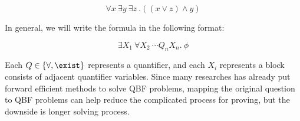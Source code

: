 \[ \forall x\ \exists y\ \exists z\ .((x\lor z)\land y) \]

In general, we will write the formula in the following format:

\[ \exists X_1\ \forall X_2\ \cdots Q_nX_n .~\phi \]

Each $Q \in \{\forall, \exist\}$ represents a quantifier, and each $X_i$ represents a block consists of adjacent quantifier variables. Since many researches has already put forward efficient methods to solve QBF problems, mapping the original question to QBF problems can help reduce the complicated process for proving, but the downside is longer solving process.

